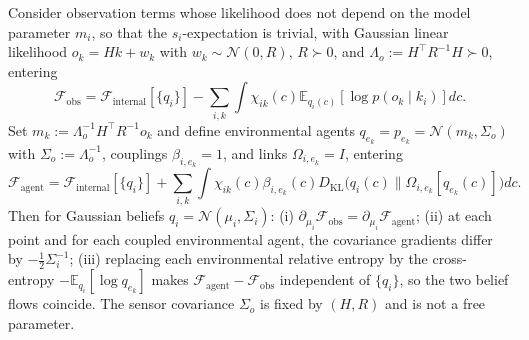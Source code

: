 \begin{proposition}\label{prop:gaussian_sensor_equivalence}
Consider observation terms whose likelihood does not depend on the model parameter $m_i$, so that the $s_i$-expectation is trivial, with Gaussian linear likelihood $o_k = H k + w_k$ with $w_k \sim \mathcal{N}(0, R)$, $R \succ 0$, and $\Lambda_o := H^\top R^{-1} H \succ 0$, entering
\begin{equation}
\mathcal{F}_{\text{obs}} = \mathcal{F}_{\text{internal}}[\{q_i\}] - \sum_{i,k} \int \chi_{ik}(c)  \mathbb{E}_{q_i(c)}[\log p(o_k\mid k_i)]  dc .
\end{equation}
Set $m_k := \Lambda_o^{-1} H^\top R^{-1} o_k$ and define environmental agents $q_{e_k} = p_{e_k} = \mathcal{N}(m_k, \Sigma_o)$ with $\Sigma_o := \Lambda_o^{-1}$, couplings $\beta_{i,e_k} = 1$, and links $\Omega_{i,e_k} = I$, entering
\begin{equation}
\mathcal{F}_{\text{agent}} = \mathcal{F}_{\text{internal}}[\{q_i\}] + \sum_{i,k} \int \chi_{ik}(c)  \beta_{i,e_k}(c)  D_{\mathrm{KL}}\big(q_i(c) \| \Omega_{i,e_k}[q_{e_k}(c)]\big)  dc .
\end{equation}
Then for Gaussian beliefs $q_i = \mathcal{N}(\mu_i, \Sigma_i)$: (i) $\partial_{\mu_i}\mathcal{F}_{\text{obs}} = \partial_{\mu_i}\mathcal{F}_{\text{agent}}$; (ii) at each point and for each coupled environmental agent, the covariance gradients differ by $-\tfrac{1}{2}\Sigma_i^{-1}$; (iii) replacing each environmental relative entropy by the cross-entropy $-\mathbb{E}_{q_i}[\log q_{e_k}]$ makes $\mathcal{F}_{\text{agent}} - \mathcal{F}_{\text{obs}}$ independent of $\{q_i\}$, so the two belief flows coincide. The sensor covariance $\Sigma_o$ is fixed by $(H, R)$ and is not a free parameter.
\end{proposition}


